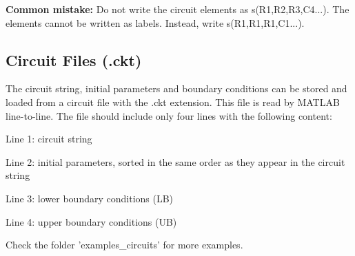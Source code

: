 \documentclass[10pt,a4paper,oneside]{book}
\begin{document}
\textbf{Common mistake:} Do not write the circuit elements as s(R1,R2,R3,C4...). The elements cannot be written as labels. Instead, write s(R1,R1,R1,C1...).

\subsection{Circuit Files (.ckt)}

The circuit string, initial parameters and boundary conditions can be stored and loaded from a circuit file with the .ckt extension. This file is read by MATLAB line-to-line. The file should include only four lines with the following content:

Line 1: circuit string

Line 2: initial parameters, sorted in the same order as they appear in the circuit string

Line 3: lower boundary conditions (LB)

Line 4: upper boundary conditions (UB)

Check the folder 'examples\_circuits' for more examples.

\begin{center}
\end{center}
\end{document}
